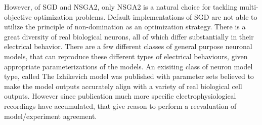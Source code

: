 However, of SGD and NSGA2, only NSGA2 is a natural choice for tackling multi-objective optimization problems. Default implementations of SGD are not able to utilize the principle of non-domination as an optimization strategy.%
There is a great diversity of real biological neurons, all of which differ substantially in their electrical behavior. There are a few different classes of general purpose neuronal models, that can reproduce these different types of electrical behaviours, given appropriate parameterizations of the models.\newline
\newline
An exisiting class of neuron model type, called The Izhikevich model was published with parameter sets believed to make the model outputs accurately align with a variety of real biological cell outputs. However since publication much more specific electrophysiological recordings have accumulated, that give reason to perform a reevaluation of model/experiment agreement. 

